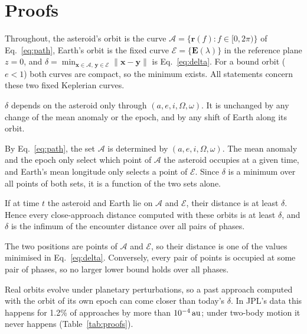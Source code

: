 \appendices

\section{Proofs}
\label{app:proofs}
Throughout, the asteroid's orbit is the curve $\mathcal{A} = \{\mathbf{r}(f) : f \in [0, 2\pi)\}$ of Eq.~\eqref{eq:path}, Earth's orbit is the fixed curve $\mathcal{E} = \{\mathbf{E}(\lambda)\}$ in the reference plane $z = 0$, and $\delta = \min_{\mathbf{x}\in\mathcal{A},\,\mathbf{y}\in\mathcal{E}}\lVert\mathbf{x} - \mathbf{y}\rVert$ is Eq.~\eqref{eq:delta}. For a bound orbit ($e < 1$) both curves are compact, so the minimum exists. All statements concern these two fixed Keplerian curves.

\begin{proposition}\label{prop:time}
$\delta$ depends on the asteroid only through $(a, e, i, \Omega, \omega)$. It is unchanged by any change of the mean anomaly or the epoch, and by any shift of Earth along its orbit.
\end{proposition}
\begin{IEEEproof}
By Eq.~\eqref{eq:path}, the set $\mathcal{A}$ is determined by $(a, e, i, \Omega, \omega)$. The mean anomaly and the epoch only select which point of $\mathcal{A}$ the asteroid occupies at a given time, and Earth's mean longitude only selects a point of $\mathcal{E}$. Since $\delta$ is a minimum over all points of both sets, it is a function of the two sets alone.
\end{IEEEproof}

\begin{proposition}\label{prop:miss}
If at time $t$ the asteroid and Earth lie on $\mathcal{A}$ and $\mathcal{E}$, their distance is at least $\delta$. Hence every close-approach distance computed with these orbits is at least $\delta$, and $\delta$ is the infimum of the encounter distance over all pairs of phases.
\end{proposition}
\begin{IEEEproof}
The two positions are points of $\mathcal{A}$ and $\mathcal{E}$, so their distance is one of the values minimised in Eq.~\eqref{eq:delta}. Conversely, every pair of points is occupied at some pair of phases, so no larger lower bound holds over all phases.
\end{IEEEproof}
Real orbits evolve under planetary perturbations, so a past approach computed with the orbit of its own epoch can come closer than today's $\delta$. In JPL's data this happens for 1.2\% of approaches by more than $10^{-4}\,\mathrm{au}$; under two-body motion it never happens (Table~\ref{tab:proofs}).

